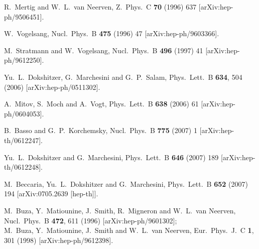 \documentclass[12pt]{article}
\begin{document}
\begin{thebibliography}{99}
  R.~Mertig and W.~L.~van Neerven,
  Z.\ Phys.\  C {\bf 70} (1996) 637
  [arXiv:hep-ph/9506451].

  W.~Vogelsang,
  Nucl.\ Phys.\  B {\bf 475} (1996) 47
  [arXiv:hep-ph/9603366].


  M.~Stratmann and W.~Vogelsang,
  Nucl.\ Phys.\  B {\bf 496} (1997) 41
  [arXiv:hep-ph/9612250].

  Yu.~L.~Dokshitzer, G.~Marchesini and G.~P.~Salam,
  Phys.\ Lett.\  B {\bf 634}, 504 (2006)
  [arXiv:hep-ph/0511302].


  A.~Mitov, S.~Moch and A.~Vogt,
  Phys.\ Lett.\  B {\bf 638} (2006) 61
  [arXiv:hep-ph/0604053].

  B.~Basso and G.~P.~Korchemsky,
  Nucl.\ Phys.\  B {\bf 775} (2007) 1
  [arXiv:hep-th/0612247].

  Yu.~L.~Dokshitzer and G.~Marchesini,
  Phys.\ Lett.\  B {\bf 646} (2007) 189
  [arXiv:hep-th/0612248].

  M.~Beccaria, Yu.~L.~Dokshitzer and G.~Marchesini,
  Phys.\ Lett.\  B {\bf 652} (2007) 194
  [arXiv:0705.2639 [hep-th]].



  M.~Buza, Y.~Matiounine, J.~Smith, R.~Migneron and W.~L.~van Neerven,
  Nucl.\ Phys.\ B {\bf 472}, 611 (1996)
  [arXiv:hep-ph/9601302];\\
%
  M.~Buza, Y.~Matiounine, J.~Smith and W.~L.~van Neerven,
  Eur.\ Phys.\ J.\ C {\bf 1}, 301 (1998)
  [arXiv:hep-ph/9612398].


\end{thebibliography}
\end{document}
